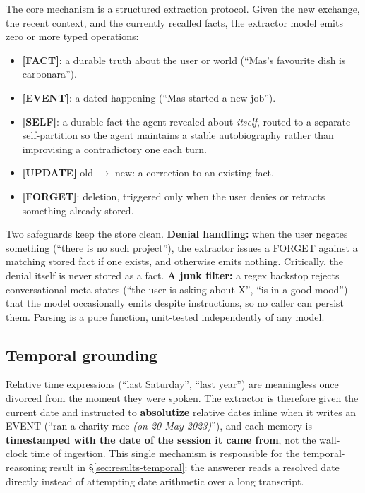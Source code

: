 The core mechanism is a structured extraction protocol. Given the new exchange,
the recent context, and the currently recalled facts, the extractor model emits
zero or more typed operations:

\begin{itemize}
  \item \textbf{[FACT]}: a durable truth about the user or world (``Mas's favourite dish is
  carbonara'').
  \item \textbf{[EVENT]}: a dated happening (``Mas started a new job'').
  \item \textbf{[SELF]}: a durable fact the agent revealed about \emph{itself}, routed to a
  separate self-partition so the agent maintains a stable autobiography rather
  than improvising a contradictory one each turn.
  \item \textbf{[UPDATE]} old $\rightarrow$ new: a correction to an existing fact.
  \item \textbf{[FORGET]}: deletion, triggered only when the user denies or retracts
  something already stored.
\end{itemize}

Two safeguards keep the store clean. \textbf{Denial handling:} when the user negates
something (``there is no such project''), the extractor issues a FORGET against a
matching stored fact if one exists, and otherwise emits nothing. Critically,
the denial itself is never stored as a fact. \textbf{A junk filter:} a regex backstop
rejects conversational meta-states (``the user is asking about X'', ``is in a good
mood'') that the model occasionally emits despite instructions, so no caller can
persist them. Parsing is a pure function, unit-tested independently of any model.

\subsection{Temporal grounding}
\label{sec:method-temporal}

Relative time expressions (``last Saturday'', ``last year'') are meaningless once
divorced from the moment they were spoken. The extractor is therefore given the
current date and instructed to \textbf{absolutize} relative dates inline when it
writes an EVENT (``ran a charity race \emph{(on 20 May 2023)}''), and each memory is
\textbf{timestamped with the date of the session it came from}, not the wall-clock
time of ingestion. This single mechanism is responsible for the temporal-reasoning
result in \S\ref{sec:results-temporal}: the answerer reads a resolved date
directly instead of attempting date arithmetic over a long transcript.

